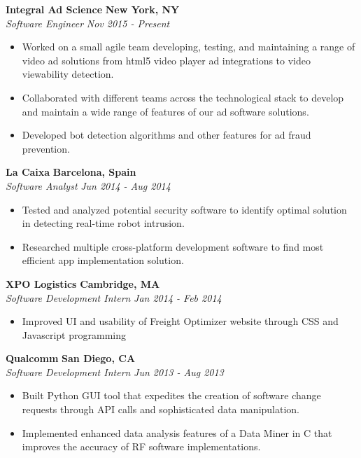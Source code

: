 \documentclass{res}
\begin{document}
\begin{resume}
 {\bf Integral Ad Science} \hfill {\bf New York, NY} \\
{\textit {Software Engineer}} \hfill {\textit {Nov 2015 - Present}} 
\begin{itemize}
\renewcommand{\labelitemi}{\ding{117}}
\itemsep -2pt  
 \item Worked on a small agile team developing, testing, and maintaining a range of video ad solutions from html5 video player ad integrations to video viewability detection.
  \item Collaborated with different teams across the technological stack to develop and maintain a wide range of features of our ad software solutions.
 \item Developed bot detection algorithms and other features for ad fraud prevention.

 \end{itemize}

 {\bf La Caixa} \hfill {\bf Barcelona, Spain} \\
{\textit {Software Analyst}} \hfill {\textit {Jun 2014 - Aug 2014}}
 \begin{itemize} 
\renewcommand{\labelitemi}{\ding{117}}
\itemsep -2pt  
 \item	Tested and analyzed potential security software to identify optimal solution in detecting real-time robot intrusion.
 \item  Researched multiple cross-platform development software to find most efficient app implementation solution.
 \end{itemize}

 {\bf XPO Logistics} \hfill {\bf Cambridge, MA} \\
{\textit {Software Development Intern}} \hfill {\textit {Jan 2014 - Feb 2014}} 
 \begin{itemize}
\renewcommand{\labelitemi}{\ding{117}}
\itemsep -2pt  

 \item Improved UI and usability of Freight Optimizer website through CSS and Javascript programming
 \end{itemize}

 {\bf Qualcomm} \hfill {\bf San Diego, CA} \\
{\textit {Software Development Intern}} \hfill {\textit {Jun 2013 - Aug 2013}} 
 \begin{itemize} 
\renewcommand{\labelitemi}{\ding{117}}
\itemsep -2pt  
 \item Built Python GUI tool that expedites the creation of software 
	change requests through API calls and sophisticated data manipulation.
 \item Implemented enhanced data analysis features of a Data Miner in C that
	 improves the accuracy of RF software implementations.
 \end{itemize}


\end{resume}
\end{document}
